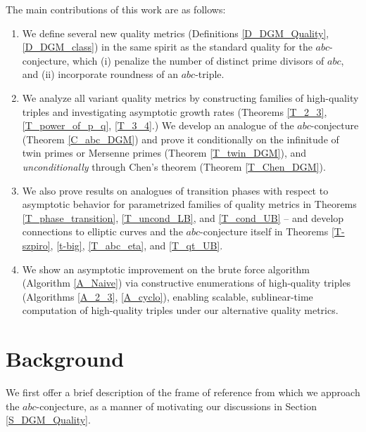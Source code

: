 \documentclass[11pt,letterpaper]{amsart}
\begin{document}
The main contributions of this work are as follows:
\begin{enumerate}
    \item We define several new quality metrics (Definitions \ref{D_DGM_Quality}, \ref{D_DGM_class}) in the same spirit as the standard quality for the $abc$-conjecture, which (i) penalize the number of distinct prime divisors of $abc$, and (ii) incorporate roundness of an $abc$-triple.
    \item We analyze all variant quality metrics by constructing families of high-quality triples and investigating asymptotic growth rates (Theorems \ref{T_2_3}, \ref{T_power_of_p_q}, \ref{T_3_4}.) We develop an analogue of the $abc$-conjecture (Theorem \ref{C_abc_DGM}) and prove it conditionally on the infinitude of twin primes or Mersenne primes (Theorem \ref{T_twin_DGM}), and \emph{unconditionally} through Chen's theorem (Theorem \ref{T_Chen_DGM}). 
    \item We also prove results on analogues of transition phases with respect to asymptotic behavior for parametrized families of quality metrics in Theorems \ref{T_phase_transition}, \ref{T_uncond_LB}, and \ref{T_cond_UB} – and develop connections to elliptic curves and the $abc$-conjecture itself in Theorems \ref{T-szpiro}, \ref{t-big}, \ref{T_abc_eta}, and \ref{T_qt_UB}.
    \item We show an asymptotic improvement on the brute force algorithm (Algorithm \ref{A_Naive}) via constructive enumerations of high-quality triples (Algorithms \ref{A_2_3}, \ref{A_cyclo}), enabling scalable, sublinear-time computation of high-quality triples under our alternative quality metrics.
\end{enumerate}

\section{Background}
\label{S_Background}

We first offer a brief description of the frame of reference from which we approach the $abc$-conjecture, as a manner of motivating our discussions in Section \ref{S_DGM_Quality}.

\iffalse
\end{document}
